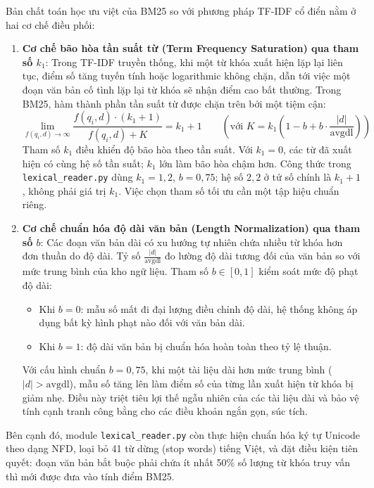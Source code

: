 Bản chất toán học ưu việt của BM25 so với phương pháp TF-IDF cổ điển nằm ở hai cơ chế điều phối:
\begin{enumerate}[nosep]
  \item \textbf{Cơ chế bão hòa tần suất từ (Term Frequency Saturation) qua tham số $k_1$}:
  Trong TF-IDF truyền thống, khi một từ khóa xuất hiện lặp lại liên tục, điểm số tăng tuyến tính hoặc logarithmic không chặn, dẫn tới việc một đoạn văn bản cố tình lặp lại từ khóa sẽ nhận điểm cao bất thường. Trong BM25, hàm thành phần tần suất từ được chặn trên bởi một tiệm cận:
  \begin{equation}
    \lim_{f(q_i, d) \to \infty} \frac{f(q_i, d) \cdot (k_1 + 1)}{f(q_i, d) + K} = k_1 + 1 \qquad \left(\text{với } K = k_1 \left(1 - b + b \cdot \frac{|d|}{\text{avgdl}}\right)\right)
    \label{eq:bm25_saturation_limit}
  \end{equation}
  Tham số $k_1$ điều khiển độ bão hòa theo tần suất. Với $k_1=0$, các từ đã xuất hiện có cùng hệ số tần suất; $k_1$ lớn làm bão hòa chậm hơn. Công thức trong \texttt{lexical\_reader.py} dùng $k_1=1{,}2$, $b=0{,}75$; hệ số $2{,}2$ ở tử số chính là $k_1+1$, không phải giá trị $k_1$. Việc chọn tham số tối ưu cần một tập hiệu chuẩn riêng.

  \item \textbf{Cơ chế chuẩn hóa độ dài văn bản (Length Normalization) qua tham số $b$}:
  Các đoạn văn bản dài có xu hướng tự nhiên chứa nhiều từ khóa hơn đơn thuần do độ dài. Tỷ số $\frac{|d|}{\text{avgdl}}$ đo lường độ dài tương đối của văn bản so với mức trung bình của kho ngữ liệu. Tham số $b \in [0, 1]$ kiểm soát mức độ phạt độ dài:
  \begin{itemize}[nosep]
    \item Khi $b = 0$: mẫu số mất đi đại lượng điều chỉnh độ dài, hệ thống không áp dụng bất kỳ hình phạt nào đối với văn bản dài.
    \item Khi $b = 1$: độ dài văn bản bị chuẩn hóa hoàn toàn theo tỷ lệ thuận.
  \end{itemize}
  Với cấu hình chuẩn \textbf{$b = 0{,}75$}, khi một tài liệu dài hơn mức trung bình ($|d| > \text{avgdl}$), mẫu số tăng lên làm điểm số của từng lần xuất hiện từ khóa bị giảm nhẹ. Điều này triệt tiêu lợi thế ngẫu nhiên của các tài liệu dài và bảo vệ tính cạnh tranh công bằng cho các điều khoản ngắn gọn, súc tích.
\end{enumerate}

Bên cạnh đó, module \texttt{lexical\_reader.py} còn thực hiện chuẩn hóa ký tự Unicode theo dạng NFD, loại bỏ 41 từ dừng (stop words) tiếng Việt, và đặt điều kiện tiên quyết: đoạn văn bản bắt buộc phải chứa ít nhất 50\% số lượng từ khóa truy vấn thì mới được đưa vào tính điểm BM25.

